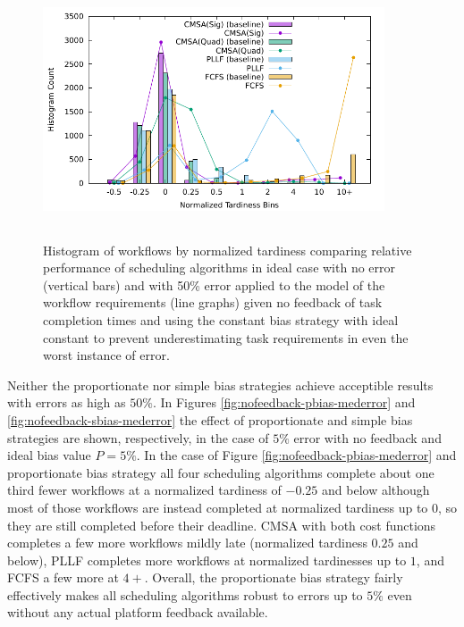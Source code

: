 \documentclass[10pt]{csce}
\begin{document}
\begin{figure}
	\begin{center}
		\includegraphics[width=0.9\textwidth,height=3in]{figures/Histogram_All_CompleteHighAllUniformError_WithCBias.pdf}
	\end{center}
	\caption{Histogram of workflows by normalized tardiness comparing
		relative performance of scheduling algorithms in ideal case with no
		error (vertical bars) and with 50\% error applied to the model of the
		workflow requirements (line graphs) given no feedback of task
		completion times and using the constant bias strategy with ideal
		constant to prevent underestimating task requirements in even the
		worst instance of error.}
	\label{fig:nofeedback-cbias-higherror}
\end{figure}

Neither the proportionate nor simple bias strategies achieve acceptible
results with errors as high as $50\%$.  In Figures
\ref{fig:nofeedback-pbias-mederror} and \ref{fig:nofeedback-sbias-mederror}
the effect of proportionate and simple bias strategies are shown, respectively,
in the case of $5\%$ error with no feedback and ideal bias value $P=5\%$.
In the case of Figure \ref{fig:nofeedback-pbias-mederror} and proportionate
bias strategy all four scheduling algorithms complete about one third fewer
workflows at a normalized tardiness of $-0.25$ and below although most of those
workflows are instead completed at normalized tardiness up to $0$, so they are
still completed before their deadline.  CMSA with both cost functions completes
a few more workflows mildly late (normalized tardiness $0.25$ and below), PLLF
completes more workflows at normalized tardinesses up to $1$, and FCFS a few
more at $4+$.  Overall, the proportionate bias strategy fairly effectively
makes all scheduling algorithms robust to errors up to $5\%$ even without any
actual platform feedback available.
\end{document}
